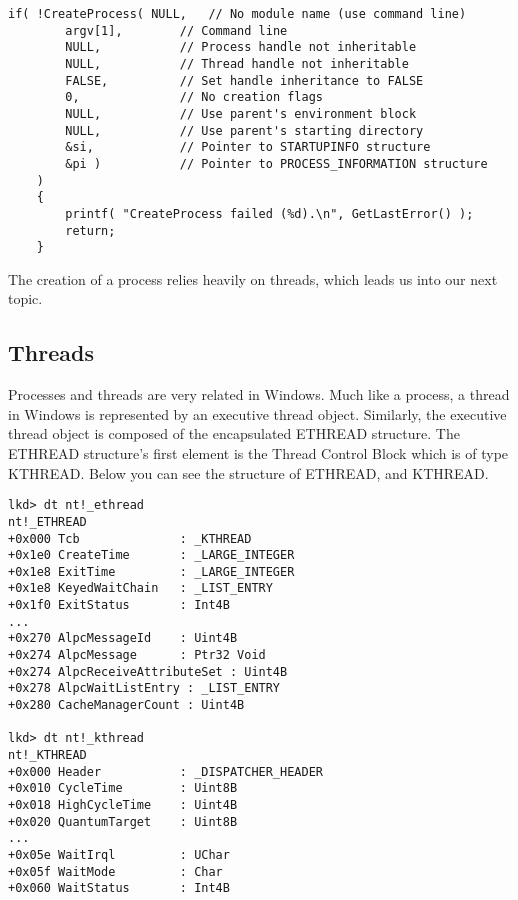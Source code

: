 \documentclass[letterpaper,10pt,titlepage,draftclsnofoot,onecolumn]{IEEEtran}
\begin{document}
\begin{lstlisting}
if( !CreateProcess( NULL,   // No module name (use command line)
        argv[1],        // Command line
        NULL,           // Process handle not inheritable
        NULL,           // Thread handle not inheritable
        FALSE,          // Set handle inheritance to FALSE
        0,              // No creation flags
        NULL,           // Use parent's environment block
        NULL,           // Use parent's starting directory 
        &si,            // Pointer to STARTUPINFO structure
        &pi )           // Pointer to PROCESS_INFORMATION structure
    ) 
    {
        printf( "CreateProcess failed (%d).\n", GetLastError() );
        return;
    }
\end{lstlisting}

The creation of a process relies heavily on threads, which leads us into our next topic.

\subsection{Threads}
Processes and threads are very related in Windows. Much like a process, a thread in Windows is represented by an executive thread object. Similarly, the executive thread object is composed of the encapsulated ETHREAD structure. \cite{windows} The ETHREAD structure's first element is the Thread Control Block which is of type KTHREAD. Below you can see the structure of ETHREAD, and KTHREAD. 

\begin{lstlisting}
lkd> dt nt!_ethread
nt!_ETHREAD
+0x000 Tcb				: _KTHREAD
+0x1e0 CreateTime		: _LARGE_INTEGER
+0x1e8 ExitTime			: _LARGE_INTEGER
+0x1e8 KeyedWaitChain	: _LIST_ENTRY
+0x1f0 ExitStatus		: Int4B
...
+0x270 AlpcMessageId	: Uint4B
+0x274 AlpcMessage		: Ptr32 Void
+0x274 AlpcReceiveAttributeSet : Uint4B
+0x278 AlpcWaitListEntry : _LIST_ENTRY
+0x280 CacheManagerCount : Uint4B

lkd> dt nt!_kthread
nt!_KTHREAD
+0x000 Header			: _DISPATCHER_HEADER
+0x010 CycleTime		: Uint8B
+0x018 HighCycleTime	: Uint4B
+0x020 QuantumTarget	: Uint8B
...
+0x05e WaitIrql			: UChar
+0x05f WaitMode			: Char
+0x060 WaitStatus		: Int4B
\end{lstlisting}
\end{document}
